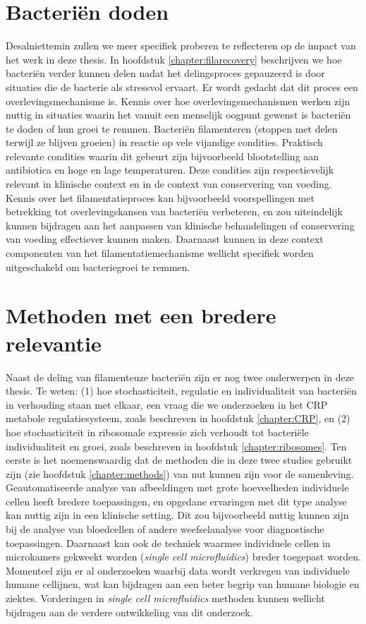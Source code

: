 \section*{Bacteriën doden}

Desalniettemin zullen we meer specifiek proberen te reflecteren op de impact van het werk in deze thesis.
%
In hoofdstuk \ref{chapter:filarecovery} beschrijven we hoe bacteriën verder kunnen delen nadat
het delingsproces gepauzeerd is door situaties die de bacterie als stressvol ervaart. 
%
Er wordt gedacht dat dit proces een overlevingsmechanisme is.
%
Kennis over hoe overlevingsmechanismen werken zijn nuttig in situaties waarin
het vanuit een menselijk oogpunt gewenst is bacteriën te doden of hun groei te remmen.
%
Bacteriën filamenteren (stoppen met delen terwijl ze blijven groeien) in reactie op vele vijandige condities. 
Praktisch relevante condities waarin dit gebeurt zijn bijvoorbeeld blootstelling aan antibiotica en hoge en lage temperaturen.
%
Deze condities zijn respectievelijk relevant in klinische context en in de context van conservering van voeding.
%
Kennis over het filamentatieproces kan bijvoorbeeld voorspellingen met betrekking tot overlevingskansen van bacteriën verbeteren,
en zou uiteindelijk kunnen bijdragen aan het aanpassen van klinische behandelingen of conservering van voeding effectiever kunnen maken. 
%
Daarnaast kunnen in deze context componenten van het filamentatiemechanisme wellicht specifiek worden uitgeschakeld om 
bacteriegroei te remmen.


\section*{Methoden met een bredere relevantie}

Naast de deling van filamenteuze bacteriën zijn er nog twee onderwerpen in deze thesis.
%
Te weten: 
(1) hoe stochasticiteit, regulatie en individualiteit van bacteriën in verhouding staan met elkaar, een vraag die we onderzoeken in het CRP metabole regulatiesysteem, zoals beschreven in hoofdstuk \ref{chapter:CRP},
en (2) hoe stochasticiteit in ribosomale expressie zich verhoudt tot bacteriële individualiteit en groei, zoals beschreven in hoofdstuk \ref{chapter:ribosomes}.
%
Ten eerste is het noemenswaardig dat de methoden die in deze twee studies gebruikt zijn (zie hoofdstuk \ref{chapter:methods})
van nut kunnen zijn voor de samenleving.
%
Geautomatiseerde analyse van afbeeldingen met grote hoeveelheden individuele cellen heeft bredere toepassingen, 
en opgedane ervaringen met dit type analyse kan nuttig zijn in een klinische setting. 
%
Dit zou bijvoorbeeld nuttig kunnen zijn bij de analyse van bloedcellen of andere weefselanalyse voor diagnostische toepassingen.
%
Daarnaast kan ook de techniek waarmee individuele cellen in microkamers gekweekt worden (\textit{single cell microfluidics}) breder toegepast worden.
%
Momenteel zijn er al onderzoeken waarbij data wordt verkregen van individuele humane cellijnen, 
wat kan bijdragen aan een beter begrip van humane biologie en ziektes.
%
Vorderingen in \textit{single cell microfluidics} methoden kunnen wellicht bijdragen aan de verdere ontwikkeling van dit onderzoek.



